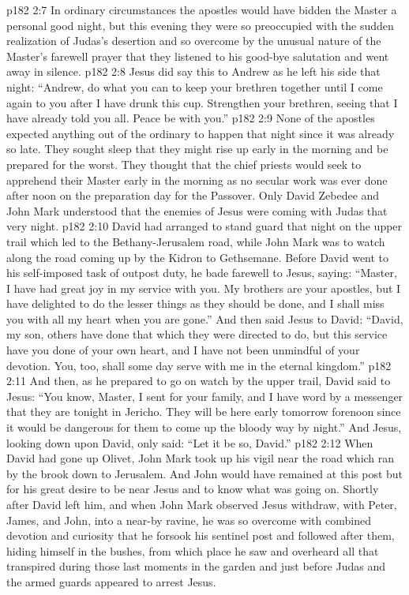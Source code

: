 \pc \vs p182 2:7 In ordinary circumstances the apostles would have bidden the Master a personal good night, but this evening they were so preoccupied with the sudden realization of Judas’s desertion and so overcome by the unusual nature of the Master’s farewell prayer that they listened to his good\hyp{}bye salutation and went away in silence.
\vs p182 2:8 Jesus did say this to Andrew as he left his side that night: \textcolor{ubdarkred}{“Andrew, do what you can to keep your brethren together until I come again to you after I have drunk this cup. Strengthen your brethren, seeing that I have already told you all. Peace be with you.”}
\vs p182 2:9 None of the apostles expected anything out of the ordinary to happen that night since it was already so late. They sought sleep that they might rise up early in the morning and be prepared for the worst. They thought that the chief priests would seek to apprehend their Master early in the morning as no secular work was ever done after noon on the preparation day for the Passover. Only David Zebedee and John Mark understood that the enemies of Jesus were coming with Judas that very night.
\pc \vs p182 2:10 David had arranged to stand guard that night on the upper trail which led to the Bethany\hyp{}Jerusalem road, while John Mark was to watch along the road coming up by the Kidron to Gethsemane. Before David went to his self\hyp{}imposed task of outpost duty, he bade farewell to Jesus, saying: “Master, I have had great joy in my service with you. My brothers are your apostles, but I have delighted to do the lesser things as they should be done, and I shall miss you with all my heart when you are gone.” And then said Jesus to David: \textcolor{ubdarkred}{“David, my son, others have done that which they were directed to do, but this service have you done of your own heart, and I have not been unmindful of your devotion. You, too, shall some day serve with me in the eternal kingdom.”}
\vs p182 2:11 And then, as he prepared to go on watch by the upper trail, David said to Jesus: “You know, Master, I sent for your family, and I have word by a messenger that they are tonight in Jericho. They will be here early tomorrow forenoon since it would be dangerous for them to come up the bloody way by night.” And Jesus, looking down upon David, only said: \textcolor{ubdarkred}{“Let it be so, David.”}
\pc \vs p182 2:12 When David had gone up Olivet, John Mark took up his vigil near the road which ran by the brook down to Jerusalem. And John would have remained at this post but for his great desire to be near Jesus and to know what was going on. Shortly after David left him, and when John Mark observed Jesus withdraw, with Peter, James, and John, into a near\hyp{}by ravine, he was so overcome with combined devotion and curiosity that he forsook his sentinel post and followed after them, hiding himself in the bushes, from which place he saw and overheard all that transpired during those last moments in the garden and just before Judas and the armed guards appeared to arrest Jesus.
